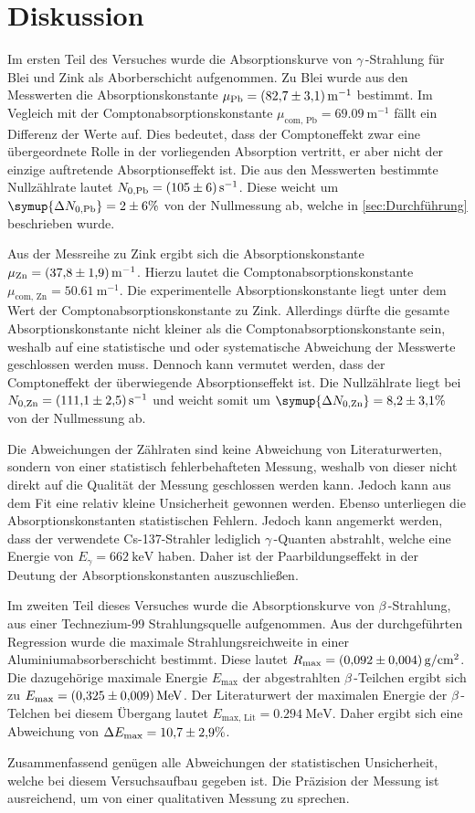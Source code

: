\section{Diskussion}
\label{sec:Diskussion}
Im ersten Teil des Versuches wurde die Absorptionskurve von $\gamma$\,-Strahlung für Blei und Zink als Aborberschicht aufgenommen.
Zu Blei wurde aus den Messwerten die Absorptionskonstante 
$\mu_\text{Pb} = \qty{82.7 +- 3.1}{\metre^{-1}}$ bestimmt. Im Vegleich mit der Comptonabsorptionskonstante $\mu_\text{com, Pb} = \qty{69.09}{\metre^{-1}}$ fällt ein Differenz der Werte auf.
Dies bedeutet, dass der Comptoneffekt zwar eine übergeordnete Rolle in der vorliegenden Absorption vertritt, er aber nicht der einzige auftretende Absorptionseffekt ist.
Die aus den Messwerten bestimmte Nullzählrate lautet $N_{0, \text{Pb}} = \qty{105 +- 6}{\second^{-1}}$. Diese weicht um $\symup{\Delta N_{0, \text{Pb}}} = \num{2 +- 6}\%$
von der Nullmessung ab, welche in \autoref{sec:Durchführung} beschrieben wurde.

Aus der Messreihe zu Zink ergibt sich die Absorptionskonstante $\mu_{\text{Zn}} = \qty{37.8 +- 1.9}{\metre^{-1}}$. Hierzu lautet die Comptonabsorptionskonstante 
$\mu_{\text{com, Zn}} = \qty{50.61}{\metre^{-1}}$. Die experimentelle Absorptionskonstante liegt unter dem Wert der Comptonabsorptionskonstante zu Zink. 
Allerdings dürfte die gesamte Absorptionskonstante nicht kleiner als die Comptonabsorptionskonstante 
sein, weshalb auf eine statistische und oder systematische Abweichung der Messwerte geschlossen werden muss.
Dennoch kann vermutet werden, dass der Comptoneffekt der überwiegende Absorptionseffekt ist. 
Die Nullzählrate liegt bei $N_{0, \text{Zn}} = \qty{111.1 +- 2.5}{\second^{-1}}$ und weicht somit um $\symup{\Delta N_{0, \text{Zn}}} = \num{8.2 +- 3.1}\%$ von der Nullmessung ab.

Die Abweichungen der Zählraten sind keine Abweichung von Literaturwerten, sondern von einer statistisch fehlerbehafteten Messung, weshalb von dieser nicht direkt auf die
Qualität der Messung geschlossen werden kann. Jedoch kann aus dem Fit eine relativ kleine Unsicherheit gewonnen werden. Ebenso unterliegen die Absorptionskonstanten 
statistischen Fehlern. Jedoch kann angemerkt werden, dass der verwendete Cs-137-Strahler lediglich $\gamma$\,-Quanten abstrahlt, welche eine Energie von 
$E_\gamma = \qty{662}{\kilo\electronvolt}$ \cite{physikalischesGrundpraktikum} haben. Daher ist der Paarbildungseffekt in der Deutung der Absorptionskonstanten auszuschließen.

Im zweiten Teil dieses Versuches wurde die Absorptionskurve von $\beta$\,-Strahlung, aus einer Technezium-99 Strahlungsquelle aufgenommen. Aus der durchgeführten 
Regression wurde die maximale Strahlungsreichweite in einer Aluminiumabsorberschicht bestimmt. Diese lautet $R_\text{max} = \qty{0.092 +- 0.004}{\gram\per\centi\metre\squared}$. 
Die dazugehörige maximale Energie $E_\text{max}$ der abgestrahlten $\beta$\,-Teilchen ergibt sich zu $E_\text{max} = \qty{0.325 +- 0.009}{\mega\electronvolt}$. Der Literaturwert
der maximalen Energie der $\beta$\,-Telchen bei diesem Übergang lautet $E_{\text{max, Lit}} = \qty{0.294}{\mega\electronvolt}$. Daher ergibt sich eine Abweichung von
$\Delta E_\text{max} = \num{10.7 +- 2.9}\%$. 

Zusammenfassend genügen alle Abweichungen der statistischen Unsicherheit, welche bei diesem Versuchsaufbau gegeben ist. Die Präzision der Messung ist ausreichend, um 
von einer qualitativen Messung zu sprechen.